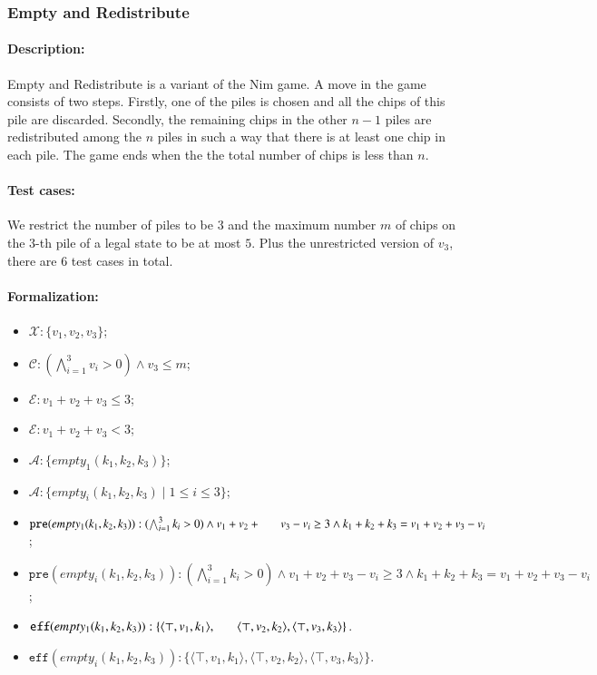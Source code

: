 \documentclass[review]{elsarticle}
\newcommand{\set}[1]{\{ #1 \}}
\newcommand{\tuple}[1]{\langle {#1} \rangle}
\newcommand{\true}{\top}
\newcommand{\statevar}{\mathcal{X}}
\newcommand{\act}{\mathcal{A}}
\newcommand{\constraint}{\mathcal{C}}
\newcommand{\estate}{\mathcal{E}}
\newcommand{\pre}{\mathtt{pre}}
\newcommand{\eff}{\mathtt{eff}}
\begin{document}
\subsubsection{Empty and Redistribute \protect\cite{Fer1998}}
\paragraph{Description:} 
Empty and Redistribute is a variant of the Nim game. 
A move in the game consists of two steps. 
Firstly, one of the piles is chosen and all the chips of this pile are discarded. 
Secondly, the remaining chips in the other $n-1$ piles are redistributed among the $n$ piles in such a way that there is at least one chip in each pile. 
The game ends when the the total number of chips is less than $n$.

\paragraph{Test cases:}
We restrict the number of piles to be $3$ and the maximum number $m$ of chips on the $3$-th pile  of a legal state to be at most $5$.
Plus the unrestricted version of $v_3$, there are $6$ test cases in total.
\paragraph{Formalization:}

	\begin{itemize}
		\item $\statevar: \set{v_1, v_2, v_3}$;
		\item $\constraint: (\bigwedge_{i=1}^{3} v_i > 0)\wedge v_3 \le m$;
		\item $\estate: v_1+ v_2 +v_3 \le 3$;
		\item {\color{red}$\estate: v_1 + v_2 + v_3 < 3$;}
		\item $\act: \set{empty_1(k_1, k_2, k_3)}$;
		\item {\color{red}$\act: \set{empty_i(k_1, k_2, k_3) \mid 1 \le i \le 3}$;}
		\item $\pre(empty_1(k_1, k_2, k_3)) :  (\bigwedge_{i=1}^{3} k_i > 0) \wedge
	v_1+v_2+ \\ \hspace*{6mm}
	v_3 - v_i \ge  3    \wedge k_1 + k_2 +k_3 = v_1+v_2+v_3 - v_i$;
		\item {\color{red}$\pre(empty_i(k_1, k_2, k_3)) : (\bigwedge_{i=1}^{3} k_i > 0) \wedge v_1 + v_2 + v_3 - v_i \ge 3 \wedge k_1 + k_2 + k_3 = v_1 + v_2 + v_3 - v_i$;}
		\item $\eff(empty_1(k_1, k_2, k_3)) : \set{\tuple{\true, v_1, k_1},\\ \hspace*{6mm}
			\tuple{\true,v_2,k_2},\tuple{\true,v_3,k_3}}$.
		\item {\color{red}$\eff(empty_i(k_1, k_2, k_3)) : \set{\tuple{\true, v_1, k_1}, \tuple{\true, v_2, k_2}, \tuple{\true, v_3, k_3}}$.}
\end{itemize}
\end{document}

